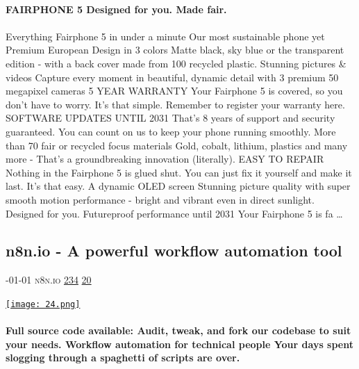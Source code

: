 \documentclass[10pt,a4paper]{article}
\begin{document}
\begin{multicols}{2}
\paragraph{}
\textbf{FAIRPHONE 5
Designed for you. Made fair.}
\paragraph{}

Everything Fairphone 5 in under a minute
Our most sustainable
phone yet
Premium European Design in 3 colors
Matte black, sky blue or the transparent edition - with a back cover made from 100 recycled plastic.
Stunning pictures \& videos
Capture every moment in beautiful, dynamic detail with 3 premium 50 megapixel cameras
5 YEAR WARRANTY
Your Fairphone 5 is covered, so you don’t have to worry. It’s that simple. Remember to register your warranty here.
SOFTWARE UPDATES UNTIL 2031
That’s 8 years of support and security guaranteed. You can count on us to keep your phone running smoothly.
More than 70 fair or recycled focus materials
Gold, cobalt, lithium, plastics and many more - That's a groundbreaking innovation (literally).
EASY TO REPAIR
Nothing in the Fairphone 5 is glued shut. You can just fix it yourself and make it last. It’s that easy.
A dynamic OLED screen
Stunning picture quality with super smooth motion performance - bright and vibrant even in direct sunlight.
Designed for you.
Futureproof performance until 2031
Your Fairphone 5 is fa
\dots\par
\noindent\begin{minipage}{\linewidth}
\medskip
\subsection{n8n.io - A powerful workflow automation tool}
\textsc{\footnotesize
{\scriptsize\faCalendar}-01-01 
{\scriptsize\faGlobe}\space 
n8n.io 
{\scriptsize\faThumbsOUp}\space 
\href{http://news.ycombinator.com/item?id=37274052\&utm\_term=comment}{234} 
{\scriptsize\faComments}\space 
\href{http://news.ycombinator.com/item?id=37274052\&utm\_term=comment}{20} 
}
\par\medskip\noindent
\href{https://n8n.io?utm\_source=hackernewsletter\&utm\_medium=email\&utm\_term=show\_hn}{
    \texttt{[image: 24.png]}
}
\end{minipage}
\paragraph{}
\textbf{Full source code available:
Audit, tweak, and fork our codebase to suit your needs.
Workflow automation for technical people
Your days spent slogging through a spaghetti of scripts are over.}

\end{multicols}
\end{document}

